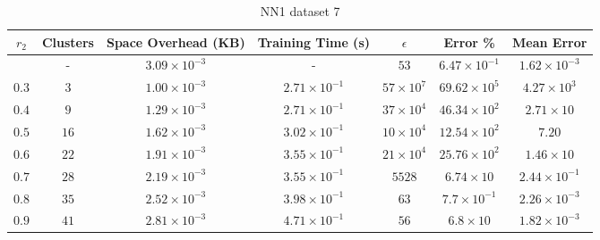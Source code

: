 \begin{adjustwidth}{-1cm}{}
\begin{table}
\caption{NN1 dataset 7}\label{ws17}
\begin{tabular}{ccccccc}
\hline
\toprule
$r_2$ & Clusters & Space Overhead (KB) & Training Time (s) & $\epsilon$ & Error \% & Mean Error\\
\midrule
& - & $3.09 \times 10^{-3}$ & - & $53$ & $6.47 \times 10^{-1}$ & $1.62 \times 10^{-3}$\\
$0.3$ & $3$ & $1.00 \times 10^{-3}$ & $2.71 \times 10^{-1}$ & $57 \times 10^7$ & $69.62 \times 10^5$ & $4.27 \times 10^3$\\
$0.4$ & $9$ & $1.29 \times 10^{-3}$ & $2.71 \times 10^{-1}$ & $37 \times 10^4$ & $46.34 \times 10^2$ & $2.71 \times 10$\\
$0.5$ & $16$ & $1.62 \times 10^{-3}$ & $3.02 \times 10^{-1}$ & $10 \times 10^4$ & $12.54 \times 10^2$ & $7.20$\\
$0.6$ & $22$ & $1.91 \times 10^{-3}$ & $3.55 \times 10^{-1}$ & $21 \times 10^4$ & $25.76 \times 10^2$ & $1.46 \times 10$\\
$0.7$ & $28$ & $2.19 \times 10^{-3}$ & $3.55 \times 10^{-1}$ & $5528$ & $6.74  \times 10$ & $2.44 \times 10^{-1}$\\
$0.8$ & $35$ & $2.52 \times 10^{-3}$ & $3.98 \times 10^{-1}$ & $63$ & $7.7 \times 10^{-1}$ & $2.26 \times 10^{-3}$\\
$0.9$ & $41$ & $2.81 \times 10^{-3}$ & $4.71 \times 10^{-1}$ & $56$ & $6.8  \times 10$ & $1.82 \times 10^{-3}$\\
\bottomrule
\end{tabular}
\end{table}
\end{adjustwidth}

